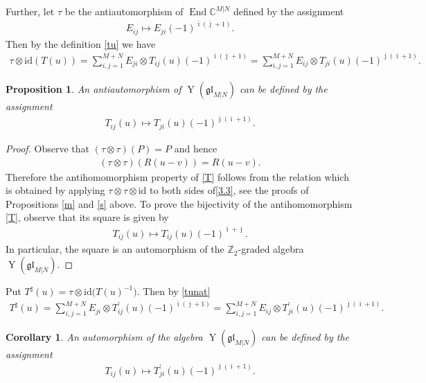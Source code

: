 \documentclass[pdftex]{sigma}
\numberwithin{equation}{section}
\newtheorem{Corollary}[Theorem]{Corollary}
\newtheorem{Proposition}[Theorem]{Proposition}
\def\bi{{\bar\imath }}
\def\bj{{\bar\jmath }}
\def\CC{{\mathbb{C}}}
\def\CMN{\CC^{M|N}}
\def\End{\operatorname{End}}
\def\glMN{\mathfrak{gl}_{M|N}}
\def\id{{\mathrm{id}}}
\def\ot{\otimes}
\def\TP{T^{\prime}}
\def\TS{T^{\sharp}}
\def\YMN{\operatorname{Y}(\glMN)}
\def\ZZ{\mathbb{Z}}
\begin{document}
Further, let $\tau$ be the antiautomorphism of $\End\CMN$
defined by the assignment
\begin{gather*}
E_{ij}\mapsto E_{ji} {(-1)}^{\bi ( \bj + 1)} .
\end{gather*}
Then by the definition \eqref{tu} we have
\begin{gather*}
\tau \ot\id ( T(u) )=
\sum_{i,j=1}^{M+N} E_{ji}\ot T_{ij}(u)
{(-1)}^{\bi ( \bj + 1)}=
\sum_{i,j=1}^{M+N} E_{ij}\ot T_{ji}(u)
{(-1)}^{\bj ( \bi + 1)} .
\end{gather*}

\begin{Proposition}
An antiautomorphism of %
$\YMN$ can be defined by the assignment
\begin{gather}
\label{T}
T_{ij}(u)\mapsto T_{ji}(u)
{(-1)}^{\bj ( \bi + 1)} .
\end{gather}
\end{Proposition}

\begin{proof}
Observe that $(\tau\ot\tau)(P)=P$ and hence
\begin{gather}
\label{Rtt}
(\tau\ot\tau)(R(u-v))=R(u-v) .
\end{gather}
Therefore the antihomomorphism property of \eqref{T}
follows from the relation which is obtained by applying
$\tau\ot\tau\ot\id$ to both sides of\eqref{3.3},
see the proofs of Propositions \ref{m} and \ref{s} above.
To prove the bijectivity of
the antihomomorphism \eqref{T}, observe
that its square is given by %
\begin{gather*}
T_{ij}(u)\mapsto T_{ij}(u)
{(-1)}^{\bi+ \bj} .
\end{gather*}
In particular, the square is an automorphism of the $\ZZ_2$-graded
algebra $\YMN $.
\end{proof}

Put
$\TS(u)=\tau \ot\id \big( T(u)^{-1} \big) $.
Then by \eqref{tunat}
\begin{gather}\label{tsu}
\TS(u)=
\sum_{i,j=1}^{M+N} E_{ji}\ot\TP_{ij}(u)
{(-1)}^{\bi ( \bj + 1)}=
\sum_{i,j=1}^{M+N} E_{ij}\ot\TP_{ji}(u)
{(-1)}^{\bj ( \bi + 1)} .
\end{gather}

\begin{Corollary}
\label{ts}
An automorphism of the algebra $\YMN$ can be defined by the assignment
\begin{gather}
\label{tusharp}
T_{ij}(u)\mapsto\TP_{ji}(u)
{(-1)}^{\bj ( \bi + 1)} .
\end{gather}
\end{Corollary}
\end{document}
